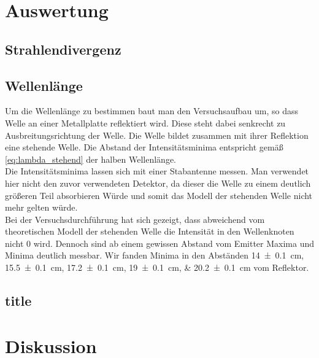 \newpage
\section{Auswertung}

\subsection{Strahlendivergenz}
\subsection{Wellenlänge}
Um die Wellenlänge zu bestimmen baut man den Versuchsaufbau um, so dass Welle an einer Metallplatte reflektiert wird. Diese steht dabei senkrecht zu Ausbreitungsrichtung der Welle. Die Welle bildet zusammen mit ihrer Reflektion eine stehende Welle. Die Abstand der Intensitätsminima entspricht gemäß \eqref{eq:lambda_stehend} der halben Wellenlänge. \\
Die Intensitätsminima lassen sich mit einer Stabantenne messen. Man verwendet hier nicht den zuvor verwendeten Detektor, da dieser die Welle zu einem deutlich größeren Teil absorbieren Würde und somit das Modell der stehenden Welle nicht mehr gelten würde. \\
Bei der Versuchsdurchführung hat sich gezeigt, dass abweichend vom theoretischen Modell der stehenden Welle die Intensität in den Wellenknoten nicht $ 0 $ wird. Dennoch sind ab einem gewissen Abstand vom Emitter Maxima und Minima deutlich messbar. Wir fanden Minima in den Abständen \SIlist{14+-.1; 15,5+-.1; 17,2+-.1; 19+-.1; 20,2+-.1}{\centi\meter} vom Reflektor.
\subsection{}
\subsection{title}
\newpage
\section{Diskussion} 
